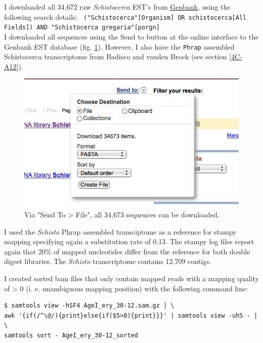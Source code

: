 \documentclass{article}\usepackage[]{graphicx}\usepackage[]{color}
\begin{document}
I downloaded all 34,672 raw \textit{Schistocerca} EST's from \href{http://www.ncbi.nlm.nih.gov/nucest}{Genbank}, using the following search details:
\verb! ("Schistocerca"[Organism] OR schistocerca[All Fields]) AND "Schistocerca gregaria"[porgn] ! \\

I downloaded all sequences using the \textsf{Send to} button at the online interface to the Genbank EST database (fig. \ref{SendTo}).
However, I also have the \texttt{Phrap} assembled Schistocerca transcriptome from Badisco and vanden Broek (see section \ref{4C-A12}).

\begin{figure}
\centering
\includegraphics[width=.8\textwidth]{./figure/Schistocerca-EST-download}
\caption{Via "Send To > File", all 34,673 sequences can be downloaded.}
\label{SendTo}
\end{figure}

I used the \textit{Schisto} Phrap assembled transciptome as a reference for stampy mapping specifying again a substitution rate of 0.13. The stampy log files report again that 20\% of mapped nucleotides differ from the reference for both double digest libraries. The \textit{Schisto} transcriptome contains 12,709 contigs.

I created sorted bam files that only contain mapped reads with a mapping quality of > 0 (i. e. unambiguous mapping position) with the following command line:
\begin{command}
\captionsetup{type=command}
\caption{Example of a command that extracts mapped reads with mapping quality above 0 and creates a position sorted .bam file.}
\begin{Verbatim}
$ samtools view -hSF4 AgeI_ery_30-12.sam.gz | \
awk '{if(/^\@/){print}else{if($5>0){print}}}' | samtools view -uhS - | \
samtools sort - AgeI_ery_30-12_sorted
\end{Verbatim}
\label{filter_good_reads}
\end{command}
\end{document}
